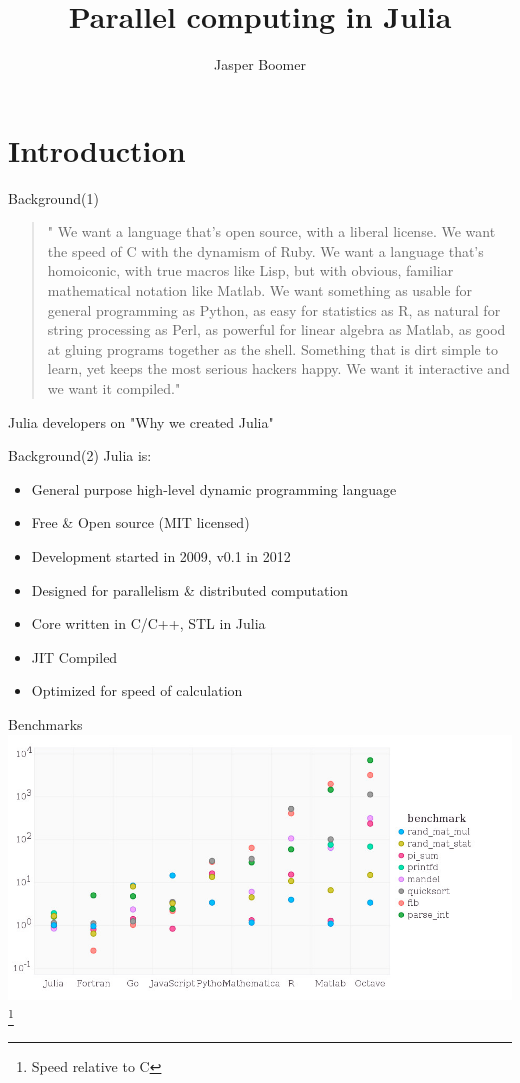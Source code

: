 \documentclass{beamer}
\title{Parallel computing in Julia}
\author{Jasper Boomer}
\begin{document}
	\frame{\titlepage}

	\section{Introduction}

	\begin{frame}{Background(1)}
		\begin{quote}
			" We want a language that’s open source, with a liberal license. We want the speed of C with the dynamism of Ruby. We want a language that’s homoiconic, with true macros like Lisp, but with obvious, familiar mathematical notation like Matlab. We want something as usable for general programming as Python, as easy for statistics as R, as natural for string processing as Perl, as powerful for linear algebra as Matlab, as good at gluing programs together as the shell. Something that is dirt simple to learn, yet keeps the most serious hackers happy. We want it interactive and we want it compiled."
		\end{quote}
		Julia developers on "Why we created Julia"
	\end{frame}


	\begin{frame}{Background(2)}
		Julia is: 
		\begin{itemize}
			\item{General purpose high-level dynamic programming language}
			\item{Free \& Open source (MIT licensed)}
			\item{Development started in 2009, v0.1 in 2012}
			\item{Designed for parallelism \& distributed computation}
			\item{Core written in C/C++, STL in Julia}
			\item{JIT Compiled}
			\item{Optimized for speed of calculation}
		\end{itemize}
	\end{frame}

	\begin{frame}{Benchmarks}
		\includegraphics[width=\textwidth]{figures/benchmarks.jpg}
		\footnote{Speed relative to C}
	\end{frame}
\end{document}
